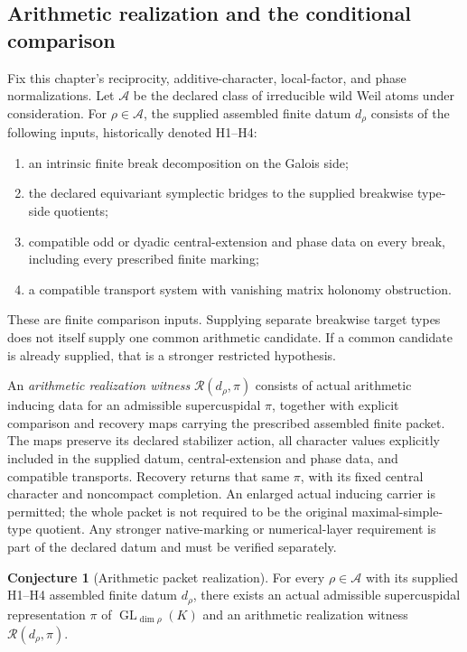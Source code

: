 \documentclass[11pt]{amsart}
\theoremstyle{definition}
\newtheorem{conjecture}[conjecture]{Conjecture}
\theoremstyle{remark}
\newcommand{\GL}{\operatorname{GL}}
\begin{document}
\subsection{Arithmetic realization and the conditional comparison}

Fix this chapter's reciprocity, additive-character, local-factor, and phase
normalizations. Let \(\mathcal A\) be the declared class of irreducible wild
Weil atoms under consideration. For \(\rho\in\mathcal A\), the supplied
assembled finite datum \(d_\rho\) consists of the following inputs,
historically denoted H1--H4:
\begin{enumerate}
\item an intrinsic finite break decomposition on the Galois side;
\item the declared equivariant symplectic bridges to the supplied breakwise
type-side quotients;
\item compatible odd or dyadic central-extension and phase data on every
break, including every prescribed finite marking;
\item a compatible transport system with vanishing matrix holonomy
obstruction.
\end{enumerate}
These are finite comparison inputs. Supplying separate breakwise target
types does not itself supply one common arithmetic candidate. If a common
candidate is already supplied, that is a stronger restricted hypothesis.

An \emph{arithmetic realization witness}
\(\mathcal R(d_\rho,\pi)\) consists of actual arithmetic inducing data
for an admissible supercuspidal \(\pi\), together with explicit
comparison and recovery maps carrying the prescribed assembled finite
packet. The maps preserve its declared stabilizer action, all character values
explicitly included in the supplied datum, central-extension and phase
data, and compatible transports.
Recovery returns that same \(\pi\), with its fixed central character and
noncompact completion. An enlarged actual inducing carrier is permitted;
the whole packet is not required to be the original maximal-simple-type
quotient. Any stronger native-marking or numerical-layer requirement is
part of the declared datum and must be verified separately.

\begingroup
\renewcommand{\theconjecture}{66}
\begin{conjecture}[Arithmetic packet realization]
\label{conj:arithmetic_realization}\label{thm:conditional_atomic}
For every \(\rho\in\mathcal A\) with its supplied H1--H4 assembled
finite datum \(d_\rho\), there exists an actual admissible supercuspidal
representation \(\pi\) of \(\GL_{\dim\rho}(K)\) and an arithmetic
realization witness \(\mathcal R(d_\rho,\pi)\).
\end{conjecture}
\endgroup
\end{document}

